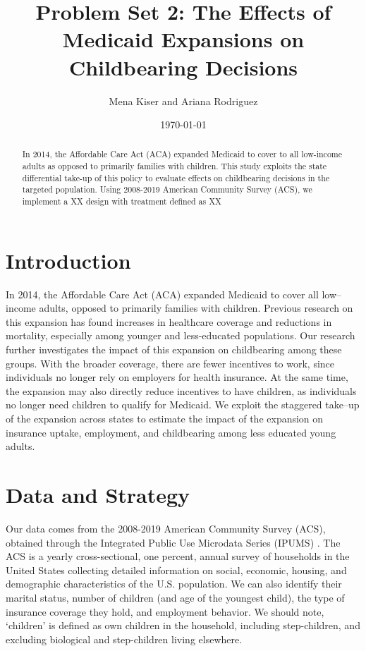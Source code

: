 \documentclass{article}
\title{Problem Set 2: The Effects of Medicaid Expansions on Childbearing Decisions}
\author{Mena Kiser and Ariana Rodriguez}
\date{\today}
\begin{document}
\maketitle

\begin{abstract}
    In 2014, the Affordable Care Act (ACA) expanded Medicaid to cover to all low-income adults as opposed to primarily families with children. This study exploits the state differential take-up of this policy to evaluate effects on childbearing decisions in the targeted population. Using 2008-2019 American Community Survey (ACS), we implement a XX design with treatment defined as XX
\end{abstract}

\section{Introduction}
In 2014, the Affordable Care Act (ACA) expanded Medicaid to cover all low–income adults, opposed to primarily families with children. Previous research on this expansion has found increases in healthcare coverage and reductions in mortality, especially among younger and less-educated populations. Our research further investigates the impact of this expansion on childbearing among these groups. With the broader coverage, there are fewer incentives to work, since individuals no longer rely on employers for health insurance. At the same time, the expansion may also directly reduce incentives to have children, as individuals no longer need children to qualify for Medicaid. We exploit the staggered take–up of the expansion across states to estimate the impact of the expansion on insurance uptake, employment, and childbearing among less educated young adults.


\section{Data and Strategy}
Our data comes from the 2008-2019 American Community Survey (ACS), obtained through the Integrated Public Use Microdata Series (IPUMS) \citep{data:acs}. The ACS is a yearly cross-sectional, one percent, annual survey of households in the United States collecting detailed information on social, economic, housing, and demographic characteristics of the U.S. population. We can also identify their marital status, number of children (and age of the youngest child), the type of insurance coverage they hold, and employment behavior. We should note, `children' is defined as own children in the household, including step-children, and excluding biological and step-children living elsewhere.
\end{document}
